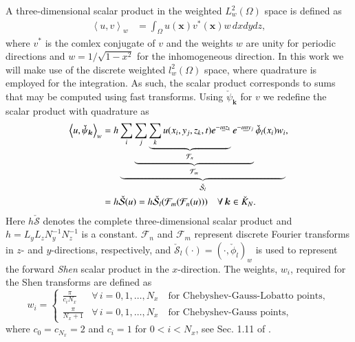 \documentclass[preprint]{elsarticle}
\newcommand{\N}[1]{\check{#1}}
\begin{document}
A three-dimensional scalar product in the weighted $L^2_w(\Omega)$ space is defined as
\begin{align}
 \left<u, v\right>_w &= \int_{\Omega} {u(\bm{x}) v^*(\bm{x})}w\,dxdydz, 
\end{align}
where $v^*$ is the comlex conjugate of $v$ and the weights $w$ are unity for 
periodic directions and  $w=1/\sqrt{1-x^2}$ for the inhomogeneous direction. In 
this work we will make use of the discrete weighted $l^2_w(\Omega)$ space, 
where quadrature is employed for the integration. As such, the scalar product 
corresponds to sums that may be computed using fast transforms. Using 
$\N{\psi}_{\bm{k}}$ for $v$ we redefine the scalar product with quadrature as
\begin{align}
 \left< u, \N{\psi}_{\bm{k}} \right>_w &= h \underbrace{\sum_i 
 \underbrace{\sum_j \underbrace{\sum_k u(x_i, y_j, z_k, t)  e^{-\imath 
 \underline{n} z_k}}_{\mathcal{F}_n}  e^{-\imath \underline{m} y_j} 
 }_{\mathcal{F}_m} \N{\phi}_{l}(x_i) w_i}_{\N{\mathcal{S}}_l},   \notag \\
  &=  h \N{\mathcal{S}}(u) = h \N{\mathcal{S}}_{l} (\mathcal{F}_{{m}} 
  (\mathcal{F}_{{n}}(u))) \quad \forall \, \bm{k} \in \N{K}_N. \label{eq:sst1}
\end{align}
Here $h\N{\mathcal{S}}$ denotes the complete three-dimensional scalar product 
and $h = L_yL_zN_y^{-1}N_z^{-1}$ is a constant. $\mathcal{F}_{{n}}$ and 
$\mathcal{F}_{{m}}$ represent discrete Fourier transforms in $z$- and 
$y$-directions, respectively, and $\N{\mathcal{S}}_{l}(\cdot) = (\cdot, 
\N{\phi}_l)_w$ is used to represent the forward \emph{Shen} scalar product in the 
$x$-direction. The weights, $w_i$, required for the Shen transforms are 
defined as
\begin{equation}
 w_i = \begin{cases}
       \frac{\pi}{c_i N_x} &\forall \, i=0,1,\ldots, N_x \quad  \text{for 
       Chebyshev-Gauss-Lobatto points},\\
       \frac{\pi}{N_x+1} &\forall \, i=0,1,\ldots, N_x  \quad \text{for 
       Chebyshev-Gauss points},      
 \end{cases}
\end{equation}
where $c_0 = c_{N_x} = 2$ and $c_i = 1$ for $0 < i < N_x$, see Sec. 1.11 of \cite{kopriva09}.%
\end{document}
